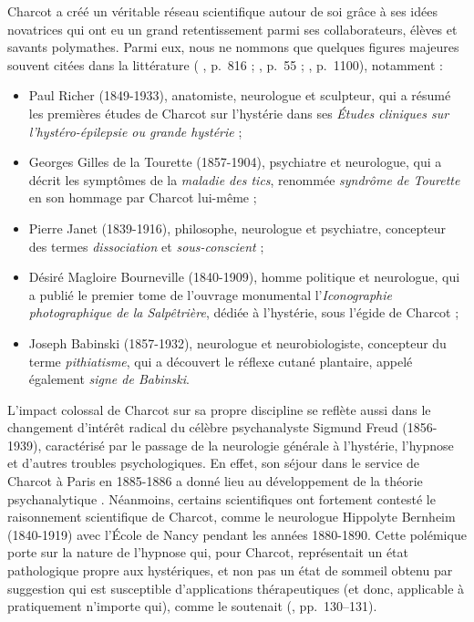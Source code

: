 Charcot a créé un véritable réseau scientifique autour de soi grâce à ses idées novatrices qui ont eu un grand retentissement parmi ses collaborateurs, élèves et savants polymathes. Parmi eux, nous ne nommons que quelques figures majeures souvent citées dans la littérature (\citeauthor{gomes2013jean} \citeyear{gomes2013jean}, p.~816 ; \citeauthor{bogousslavsky2014mysteries} \citeyear{bogousslavsky2014mysteries}, p.~55 ; \citeauthor{camargo2024} \citeyear{camargo2024}, p.~1100), notamment :
\begin{itemize}
\item Paul Richer (1849-1933), anatomiste, neurologue et sculpteur, qui a résumé les premières études de Charcot sur l'hystérie dans ses \textit{Études cliniques sur l'hystéro-épilepsie ou grande hystérie} ;
\item Georges Gilles de la Tourette (1857-1904), psychiatre et neurologue, qui a décrit les symptômes de la \textit{maladie des tics}, renommée \textit{syndrôme de Tourette} en son hommage par Charcot lui-même ;
\item Pierre Janet (1839-1916), philosophe, neurologue et psychiatre, concepteur des termes \textit{dissociation} et \textit{sous-conscient} ;
\item Désiré Magloire Bourneville (1840-1909), homme politique et neurologue, qui a publié le premier tome de l'ouvrage monumental l'\textit{Iconographie photographique de la Salpêtrière}, dédiée à l'hystérie, sous l'égide de Charcot ; 
\item Joseph Babinski (1857-1932), neurologue et neurobiologiste, concepteur du terme \textit{pithiatisme}, qui a découvert le réflexe cutané plantaire, appelé également \textit{signe de Babinski}.
\end{itemize}
\bigskip
L'impact colossal de Charcot sur sa propre discipline se reflète aussi dans le changement d'intérêt radical du célèbre psychanalyste Sigmund Freud (1856-1939), caractérisé par le passage de la neurologie générale à l'hystérie, l'hypnose et d'autres troubles psychologiques. En effet, son séjour dans le service de Charcot à Paris en 1885-1886 a donné lieu au développement de la théorie psychanalytique \citep[p.~41]{camargo2018jean}. Néanmoins, certains scientifiques ont fortement contesté le raisonnement scientifique de Charcot, comme le neurologue Hippolyte Bernheim (1840-1919) avec l'École de Nancy pendant les années 1880-1890. Cette polémique porte sur la nature de l'hypnose qui, pour Charcot, représentait un état pathologique propre aux hystériques, et non pas un état de sommeil obtenu par suggestion qui est susceptible d'applications
thérapeutiques (et donc, applicable à pratiquement n'importe qui), comme le soutenait \citeauthor{bernheim1891suggestion} (\citeyear{bernheim1891suggestion}, pp.~130--131).



